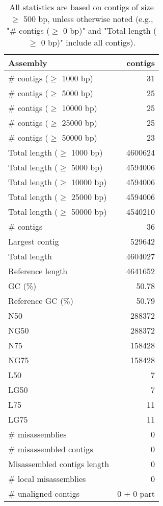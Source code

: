\documentclass[12pt,a4paper]{article}
\begin{document}
\begin{table}[ht]
\begin{center}
\caption{All statistics are based on contigs of size $\geq$ 500 bp, unless otherwise noted (e.g., "\# contigs ($\geq$ 0 bp)" and "Total length ($\geq$ 0 bp)" include all contigs).}
\begin{tabular}{|l*{1}{|r}|}
\hline
Assembly & contigs \\ \hline
\# contigs ($\geq$ 1000 bp) & 31 \\ \hline
\# contigs ($\geq$ 5000 bp) & 25 \\ \hline
\# contigs ($\geq$ 10000 bp) & 25 \\ \hline
\# contigs ($\geq$ 25000 bp) & 25 \\ \hline
\# contigs ($\geq$ 50000 bp) & 23 \\ \hline
Total length ($\geq$ 1000 bp) & 4600624 \\ \hline
Total length ($\geq$ 5000 bp) & 4594006 \\ \hline
Total length ($\geq$ 10000 bp) & 4594006 \\ \hline
Total length ($\geq$ 25000 bp) & 4594006 \\ \hline
Total length ($\geq$ 50000 bp) & 4540210 \\ \hline
\# contigs & 36 \\ \hline
Largest contig & 529642 \\ \hline
Total length & 4604027 \\ \hline
Reference length & 4641652 \\ \hline
GC (\%) & 50.78 \\ \hline
Reference GC (\%) & 50.79 \\ \hline
N50 & 288372 \\ \hline
NG50 & 288372 \\ \hline
N75 & 158428 \\ \hline
NG75 & 158428 \\ \hline
L50 & 7 \\ \hline
LG50 & 7 \\ \hline
L75 & 11 \\ \hline
LG75 & 11 \\ \hline
\# misassemblies & 0 \\ \hline
\# misassembled contigs & 0 \\ \hline
Misassembled contigs length & 0 \\ \hline
\# local misassemblies & 0 \\ \hline
\# unaligned contigs & 0 + 0 part \\ \hline

\end{tabular}
\end{center}
\end{table}
\end{document}
